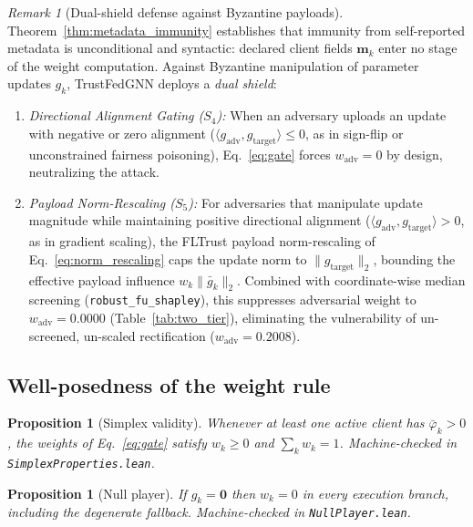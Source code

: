 \documentclass[preprint,12pt]{elsarticle}
\theoremstyle{plain}
\newtheorem{proposition}[theorem]{Proposition}
\theoremstyle{definition}
\theoremstyle{remark}
\newtheorem{remark}{Remark}
\begin{document}
\begin{remark}[Dual-shield defense against Byzantine payloads]
\label{rem:dual_shield}
Theorem~\ref{thm:metadata_immunity} establishes that immunity from self-reported metadata is unconditional and syntactic: declared client fields $\bm{m}_k$ enter no stage of the weight computation. Against Byzantine manipulation of parameter updates $g_k$, TrustFedGNN deploys a \emph{dual shield}:
\begin{enumerate}
    \item \emph{Directional Alignment Gating ($S_4$):} When an adversary uploads an update with negative or zero alignment ($\langle g_{\mathrm{adv}}, g_{\mathrm{target}}\rangle \le 0$, as in sign-flip or unconstrained fairness poisoning), Eq.~\eqref{eq:gate} forces $w_{\mathrm{adv}} = 0$ by design, neutralizing the attack.
    \item \emph{Payload Norm-Rescaling ($S_5$):} For adversaries that manipulate update magnitude while maintaining positive directional alignment ($\langle g_{\mathrm{adv}}, g_{\mathrm{target}}\rangle > 0$, as in gradient scaling), the FLTrust payload norm-rescaling of Eq.~\eqref{eq:norm_rescaling} caps the update norm to $\lVert g_{\mathrm{target}}\rVert_2$, bounding the effective payload influence $w_k \lVert\bar{g}_k\rVert_2$. Combined with coordinate-wise median screening (\texttt{robust\_fu\_shapley}), this suppresses adversarial weight to $w_{\mathrm{adv}} = 0.0000$ (Table~\ref{tab:two_tier}), eliminating the vulnerability of un-screened, un-scaled rectification ($w_{\mathrm{adv}} = 0.2008$).
\end{enumerate}
\end{remark}

\subsection{Well-posedness of the weight rule}

\begin{proposition}[Simplex validity]\label{prop:simplex}
Whenever at least one active client has $\bar{\varphi}_k > 0$, the weights of Eq.~\eqref{eq:gate} satisfy $w_k \ge 0$ and $\sum_k w_k = 1$. Machine-checked in \texttt{Simplex\allowbreak Properties.lean}.
\end{proposition}

\begin{proposition}[Null player]\label{prop:null_player}
If $g_k = \bm{0}$ then $w_k = 0$ in every execution branch, including the degenerate fallback. Machine-checked in \texttt{Null\allowbreak Player.lean}.
\end{proposition}
\end{document}
